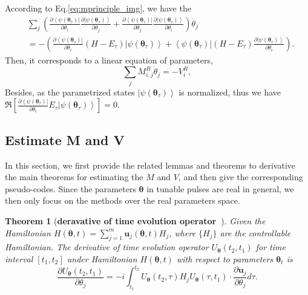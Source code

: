 \documentclass[twocolumn,
pra,aps,superscriptaddress,showpacs,amsmath,amssymb]{revtex4-2}
\newtheorem{theorem}{Theorem}
\begin{document}
\begin{itemize}
According to Eq.\eqref{eq:mprinciple_img}, we have the
\begin{align}
&\sum_j\left(\frac{\partial\left<\psi(\bm{\theta}_\tau)\right|}{\partial\theta_i}\frac{\partial\left|\psi(\bm{\theta}_\tau)\right>}{\partial\theta_j}+\frac{\partial\left<\psi(\bm{\theta}_\tau)\right|}{\partial\theta_j}\frac{\partial\left|\psi(\bm{\theta}_\tau)\right>}{\partial\theta_i}\right)\dot{\theta}_j\\
&=-\left(\frac{\partial\left<\psi(\bm{\theta}_\tau)\right|}{\partial\theta_i}(H - E_\tau)\left|\psi(\bm{\theta}_\tau)\right>+\left<\psi(\bm{\theta}_\tau)\right|(H - E_\tau)\frac{\partial\left|\psi(\bm{\theta}_\tau)\right>}{\partial\theta_i}\right).
\end{align}
Then, it corresponds to a linear equation of parameters,
\begin{equation}
\sum_jM_{i,j}^R\dot{\theta}_j = -V_i^R,
\end{equation}
Besides, as the parametrized states $\left|\psi(\bm{\theta}_\tau)\right>$ is normalized, thus we have $\Re[\frac{\partial\left<\psi(\bm{\theta}_\tau)\right|}{\partial\theta_i}E_\tau\left|\psi(\bm{\theta}_\tau)\right>]=0$.
\end{itemize}

\subsection{Estimate M and V}
In this section, we first provide the related lemmas and theorems to derivative the main theorems for estimating the $M$ and $V$, and then give the corresponding pseudo-codes. Since the parameters $\bm{\theta}$ in tunable pulses are real in general, we then only focus on the methods over the real parameters space.

\begin{theorem}[\bf{deravative of time evolution operator}~\cite{leng2022differentiable,kottmann2023evaluating}]\label{thm:deravative_evo_opt}
Given the Hamiltonian $H(\bm{\theta},t)= \sum_{j=1}^m \bm{u}_j(\bm{\theta},t)H_j$, where $\{H_j\}$ are the controllable Hamiltonian. The derivative of time evolution operator $U_{\bm{\theta}}(t_2,t_1)$ for time interval $[t_1, t_2]$ under Hamiltonian $H(\bm{\theta},t)$ with respect to parameters $\bm{\theta}_t$ is
\begin{equation}
\frac{\partial{U_{\bm{\theta}}}(t_2,t_1)}{\partial{\theta_j}} = -i\int_{t_1}^{t_2}U_{\bm{\theta}}(t_2,\tau)H_j U_{\bm{\theta}}(\tau,t_1)\cdot \frac{\partial{\bm{u}_j}}{\partial{\theta_j}}d\tau.
\end{equation}
\end{theorem}
\end{document}
